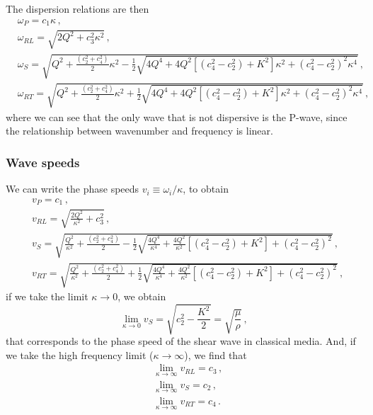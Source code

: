 \documentclass[12pt]{article}
\begin{document}
The dispersion relations are then
\begin{align}
&\omega_P = c_1 \kappa\, ,\\
&\omega_{RL} = \sqrt{2Q^2 + c_3^2 \kappa^2}\, ,\\
&\omega_S = \sqrt{Q^{2} + \frac{(c_2^2 + c_4^2)}{2}\kappa^2 - \frac{1}{2} \sqrt{4Q^4 +
   4Q^2[(c_4^2 - c_2^2) + K^2]\kappa^2 + (c_4^2 - c_2^2)^2 \kappa^4}}\, ,\\
&\omega_{RT} = \sqrt{Q^{2} + \frac{(c_2^2 + c_4^2)}{2}\kappa^2 + \frac{1}{2} \sqrt{4Q^4 +
   4Q^2[(c_4^2 - c_2^2) + K^2]\kappa^2 + (c_4^2 - c_2^2)^2 \kappa^4}}\, ,
\end{align}
where we can see that the only wave that is not dispersive is the P-wave, since the relationship between wavenumber and frequency is linear.

\subsubsection{Wave speeds}
We can write the phase speeds \(v_i \equiv \omega_i/\kappa\), to obtain
\begin{align}
&v_P = c_1 \, ,\\
&v_{RL} = \sqrt{\frac{2Q^2}{\kappa^2} + c_3^2}\, ,\\
&v_S = \sqrt{\frac{Q^2}{\kappa^2} + \frac{(c_2^2 + c_4^2)}{2} - \frac{1}{2} \sqrt{\frac{4Q^4}{\kappa^4} + \frac{4Q^2}{\kappa^2}[(c_4^2 - c_2^2) + K^2] + (c_4^2 - c_2^2)^2}}\, ,\\
&v_{RT} = \sqrt{\frac{Q^2}{\kappa^2} + \frac{(c_2^2 + c_4^2)}{2} + \frac{1}{2} \sqrt{\frac{4Q^4}{\kappa^4} + \frac{4Q^2}{\kappa^2}[(c_4^2 - c_2^2) + K^2] + (c_4^2 - c_2^2)^2}}\, ,
\end{align}
if we take the limit \(\kappa \rightarrow 0\), we obtain
\[\lim_{\kappa \rightarrow 0} v_S = \sqrt{c_2^2 - \frac{K^2}{2}}=\sqrt{\frac{\mu}{\rho}}\, ,\]
that corresponds to the phase speed of the shear wave in classical media. And, if we take the high frequency limit (\(\kappa \rightarrow \infty\)), we find that
\begin{align*}
&\lim_{\kappa \rightarrow \infty}v_{RL} = c_3\, ,\\
&\lim_{\kappa \rightarrow \infty}v_S = c_2\, ,\\
&\lim_{\kappa \rightarrow \infty}v_{RT} = c_4\, .
\end{align*}
\end{document}
